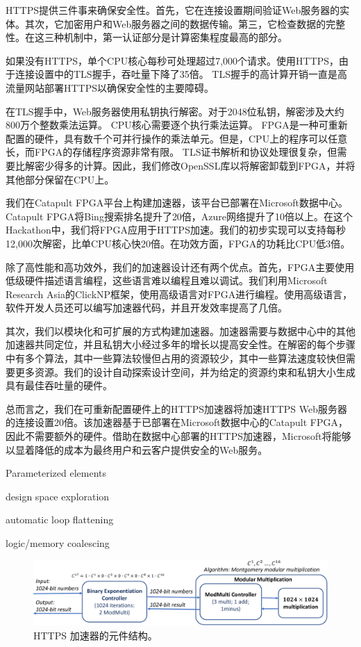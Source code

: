 HTTPS提供三件事来确保安全性。首先，它在连接设置期间验证Web服务器的实体。其次，它加密用户和Web服务器之间的数据传输。第三，它检查数据的完整性。在这三种机制中，第一认证部分是计算密集程度最高的部分。

如果没有HTTPS，单个CPU核心每秒可处理超过7,000个请求。使用HTTPS，由于连接设置中的TLS握手，吞吐量下降了35倍。 TLS握手的高计算开销一直是高流量网站部署HTTPS以确保安全性的主要障碍。

在TLS握手中，Web服务器使用私钥执行解密。对于2048位私钥，解密涉及大约800万个整数乘法运算。 CPU核心需要逐个执行乘法运算。 FPGA是一种可重新配置的硬件，具有数千个可并行操作的乘法单元。但是，CPU上的程序可以任意长，而FPGA的存储程序资源非常有限。 TLS证书解析和协议处理很复杂，但需要比解密少得多的计算。因此，我们修改OpenSSL库以将解密卸载到FPGA，并将其他部分保留在CPU上。

我们在Catapult FPGA平台上构建加速器，该平台已部署在Microsoft数据中心。 Catapult FPGA将Bing搜索排名提升了20倍，Azure网络提升了10倍以上。在这个Hackathon中，我们将FPGA应用于HTTPS加速。我们的初步实现可以支持每秒12,000次解密，比单CPU核心快20倍。在功效方面，FPGA的功耗比CPU低3倍。

除了高性能和高功效外，我们的加速器设计还有两个优点。首先，FPGA主要使用低级硬件描述语言编程，这些语言难以编程且难以调试。我们利用Microsoft Research Asia的ClickNP框架，使用高级语言对FPGA进行编程。使用高级语言，软件开发人员还可以编写加速器代码，并且开发效率提高了几倍。

其次，我们以模块化和可扩展的方式构建加速器。加速器需要与数据中心中的其他加速器共同定位，并且私钥大小经过多年的增长以提高安全性。在解密的每个步骤中有多个算法，其中一些算法较慢但占用的资源较少，其中一些算法速度较快但需要更多资源。我们的设计自动探索设计空间，并为给定的资源约束和私钥大小生成具有最佳吞吐量的硬件。

总而言之，我们在可重新配置硬件上的HTTPS加速器将加速HTTPS Web服务器的连接设置20倍。该加速器基于已部署在Microsoft数据中心的Catapult FPGA，因此不需要额外的硬件。借助在数据中心部署的HTTPS加速器，Microsoft将能够以显着降低的成本为最终用户和云客户提供安全的Web服务。


Parameterized elements

design space exploration

automatic loop flattening

logic/memory coalescing






\begin{figure}[htbp]
	\centering
	\includegraphics[width=1.0\textwidth]{image/https_accelerator}
	\caption{HTTPS 加速器的元件结构。}
	\label{clicknp:fig:https-accelerator}
\end{figure}

